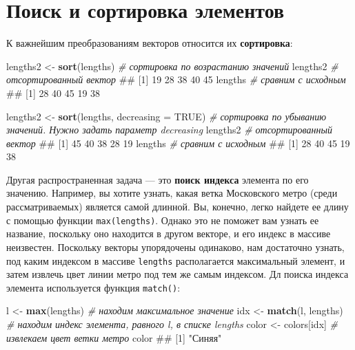 \documentclass[]{book}
\newenvironment{Shaded}{\begin{snugshade}}{\end{snugshade}}
\newcommand{\KeywordTok}[1]{\textcolor[rgb]{0.13,0.29,0.53}{\textbf{#1}}}
\newcommand{\DataTypeTok}[1]{\textcolor[rgb]{0.13,0.29,0.53}{#1}}
\newcommand{\StringTok}[1]{\textcolor[rgb]{0.31,0.60,0.02}{#1}}
\newcommand{\CommentTok}[1]{\textcolor[rgb]{0.56,0.35,0.01}{\textit{#1}}}
\newcommand{\OtherTok}[1]{\textcolor[rgb]{0.56,0.35,0.01}{#1}}
\newcommand{\NormalTok}[1]{#1}
\begin{document}
\section{Поиск и сортировка элементов}\label{---}

К важнейшим преобразованиям векторов относится их \textbf{сортировка}:

\begin{Shaded}
\begin{Highlighting}[]
\NormalTok{lengths2 <-}\StringTok{ }\KeywordTok{sort}\NormalTok{(lengths) }\CommentTok{# сортировка по возрастанию значений}
\NormalTok{lengths2 }\CommentTok{# отсортированный вектор}
\NormalTok{## [1] 19 28 38 40 45}
\NormalTok{lengths }\CommentTok{# сравним с исходным}
\NormalTok{## [1] 28 40 45 19 38}

\NormalTok{lengths2 <-}\StringTok{ }\KeywordTok{sort}\NormalTok{(lengths, }\DataTypeTok{decreasing =} \OtherTok{TRUE}\NormalTok{) }\CommentTok{# сортировка по убыванию значений. Нужно задать параметр decreasing}
\NormalTok{lengths2 }\CommentTok{# отсортированный вектор}
\NormalTok{## [1] 45 40 38 28 19}
\NormalTok{lengths }\CommentTok{# сравним с исходным}
\NormalTok{## [1] 28 40 45 19 38}
\end{Highlighting}
\end{Shaded}

Другая распространенная задача --- это \textbf{поиск индекса} элемента
по его значению. Например, вы хотите узнать, какая ветка Московского
метро (среди рассматриваемых) является самой длинной. Вы, конечно, легко
найдете ее длину с помощью функции \texttt{max(lengths)}. Однако это не
поможет вам узнать ее название, поскольку оно находится в другом
векторе, и его индекс в массиве неизвестен. Поскольку векторы
упорядочены одинаково, нам достаточно узнать, под каким индексом в
массиве \texttt{lengths} располагается максимальный элемент, и затем
извлечь цвет линии метро под тем же самым индексом. Дл поиска индекса
элемента используется функция \texttt{match()}:

\begin{Shaded}
\begin{Highlighting}[]
\NormalTok{l <-}\StringTok{ }\KeywordTok{max}\NormalTok{(lengths) }\CommentTok{# находим максимальное значение}
\NormalTok{idx <-}\StringTok{ }\KeywordTok{match}\NormalTok{(l, lengths) }\CommentTok{# находим индекс элемента, равного l, в списке lengths}
\NormalTok{color <-}\StringTok{ }\NormalTok{colors[idx] }\CommentTok{# извлекаем цвет ветки метро}
\NormalTok{color}
\NormalTok{## [1] "Синяя"}
\end{Highlighting}
\end{Shaded}
\end{document}
